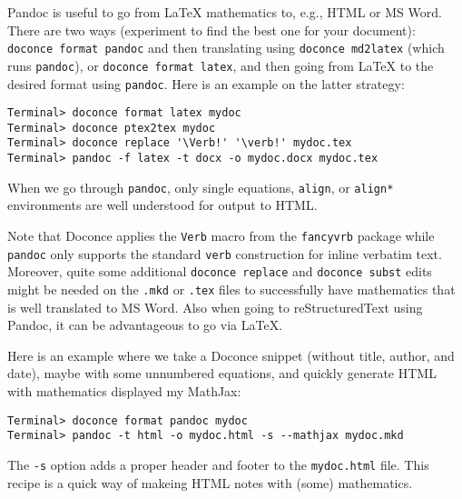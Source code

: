 \documentclass[%
oneside,                 %
final,                   %
10pt]{article}
\begin{document}
Pandoc is useful to go from {\LaTeX} mathematics to, e.g., HTML or MS
Word.  There are two ways (experiment to find the best one for your
document): {\fontsize{10pt}{10pt}\Verb!doconce format pandoc!} and then translating using {\fontsize{10pt}{10pt}\Verb!doconce md2latex!} (which runs {\fontsize{10pt}{10pt}\Verb!pandoc!}), or {\fontsize{10pt}{10pt}\Verb!doconce format latex!}, and then
going from {\LaTeX} to the desired format using {\fontsize{10pt}{10pt}\Verb!pandoc!}.
Here is an example on the latter strategy:
\vspace{4pt}
\begin{Verbatim}[numbers=none,frame=lines,fontsize=\fontsize{9pt}{9pt},labelposition=topline,framesep=2.5mm,framerule=0.7pt]
Terminal> doconce format latex mydoc
Terminal> doconce ptex2tex mydoc
Terminal> doconce replace '\Verb!' '\verb!' mydoc.tex
Terminal> pandoc -f latex -t docx -o mydoc.docx mydoc.tex
\end{Verbatim}
When we go through {\fontsize{10pt}{10pt}\Verb!pandoc!}, only single equations, {\fontsize{10pt}{10pt}\Verb!align!}, or {\fontsize{10pt}{10pt}\Verb!align*!}
environments are well understood for output to HTML.

Note that Doconce applies the {\fontsize{10pt}{10pt}\Verb!Verb!} macro from the {\fontsize{10pt}{10pt}\Verb!fancyvrb!} package
while {\fontsize{10pt}{10pt}\Verb!pandoc!} only supports the standard {\fontsize{10pt}{10pt}\Verb!verb!} construction for
inline verbatim text.  Moreover, quite some additional {\fontsize{10pt}{10pt}\Verb!doconce replace!} and {\fontsize{10pt}{10pt}\Verb!doconce subst!} edits might be needed on the {\fontsize{10pt}{10pt}\Verb!.mkd!} or
{\fontsize{10pt}{10pt}\Verb!.tex!} files to successfully have mathematics that is well translated
to MS Word.  Also when going to reStructuredText using Pandoc, it can
be advantageous to go via {\LaTeX}.

Here is an example where we take a Doconce snippet (without title, author,
and date), maybe with some unnumbered equations, and quickly generate
HTML with mathematics displayed my MathJax:
\vspace{4pt}
\begin{Verbatim}[numbers=none,frame=lines,fontsize=\fontsize{9pt}{9pt},labelposition=topline,framesep=2.5mm,framerule=0.7pt]
Terminal> doconce format pandoc mydoc
Terminal> pandoc -t html -o mydoc.html -s --mathjax mydoc.mkd
\end{Verbatim}
The {\fontsize{10pt}{10pt}\Verb!-s!} option adds a proper header and footer to the {\fontsize{10pt}{10pt}\Verb!mydoc.html!} file.
This recipe is a quick way of makeing HTML notes with (some) mathematics.
\end{document}
